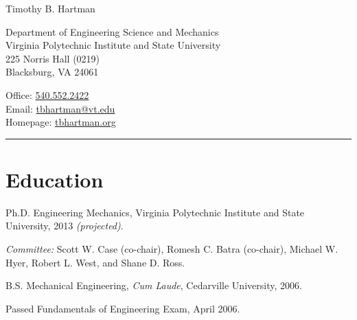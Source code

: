\documentclass[10pt,letterpaper]{article}
\newcommand\name{Timothy B. Hartman}
\renewenvironment{itemize}{
  \begin{list}{}{
    \setlength{\leftmargin}{1.5em}
    \setlength{\itemsep}{0.25em}
    \setlength{\parskip}{0pt}
    \setlength{\parsep}{0.25em}
  }
}{
  \end{list}
}
\begin{document}
{\huge \name}


\bigskip

\begin{minipage}[t]{0.5\textwidth}
  Department of Engineering Science and Mechanics \\
  Virginia Polytechnic Institute and State University \\
  225 Norris Hall (0219) \\
  Blacksburg, VA 24061
\end{minipage}
\begin{minipage}[t]{0.5\textwidth}
  Office: \href{tel:5405522422}{540.552.2422} \\
\newcommand{\email}{tbhartman@vt.edu}
  Email: \href{mailto:\email}{\email} \\
  Homepage: \href{http://tbhartman.org}{tbhartman.org}
\end{minipage}

\vspace{12pt}

\rule{\textwidth}{1pt}

%
%

\section*{Education}

\begin{itemize}
    \item Ph.D. Engineering Mechanics, Virginia Polytechnic Institute and State University, 2013 \textit{(projected)}.
    \begin{itemize}
        \item \textit{Committee:}
        Scott W. Case (co-chair), Romesh C. Batra (co-chair), Michael W. Hyer, Robert L. West, and Shane D. Ross.
    \end{itemize}
    \item B.S. Mechanical Engineering, \textit{Cum Laude}, Cedarville University, 2006.
    \begin{itemize}
        \item Passed Fundamentals of Engineering Exam, April 2006.
    \end{itemize}
\end{itemize}
\end{document}
